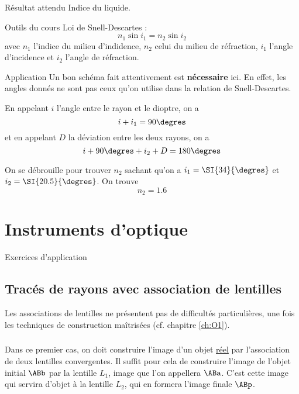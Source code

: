 \documentclass[10pt,a5paper,notitlepage]{book}
\begin{document}
\begin{NCprop}{Résultat attendu}
    Indice du liquide.
\end{NCprop}

\begin{NCdemo}{Outils du cours}
    Loi de Snell-Descartes :
    \[ n_1\sin i_1 = n_2 \sin i_2 \]
    avec $n_1$ l'indice du milieu d'indidence, $n_2$ celui du milieu de
    réfraction, $i_1$ l'angle d'incidence et $i_2$ l'angle de réfraction.
\end{NCdemo}

\begin{NCexem}{Application}
    Un bon schéma fait attentivement est \textbf{nécessaire} ici. En effet,
    les angles donnés ne sont pas ceux qu'on utilise dans la relation de
    Snell-Descartes. \bigbreak
    
    En appelant $i$ l'angle entre le rayon et le dioptre, on a
    \[ i + i_1 = 90\degres\]
    et en appelant $D$ la déviation entre les deux rayons, on a
    \[ i + 90\degres + i_2 + D = 180\degres\]

    On se débrouille pour trouver $n_2$ sachant qu'on a $i_1 = \SI{34}{\degres}$
    et $i_2 = \SI{20.5}{\degres}$. On trouve
    \[ \boxed{n_2 = 1.6} \]
\end{NCexem}

\chapter{Instruments d'optique}
\vspace*{-47pt}
\begin{center}
    \Huge Exercices d'application
\end{center}
\section{Tracés de rayons avec association de lentilles}
Les associations de lentilles ne présentent pas de difficultés particulières,
une fois les techniques de construction maîtrisées (cf. chapitre \ref{ch:O1}).

\subsection{}
Dans ce premier cas, on doit construire l'image d'un objet \underline{réel} par
l'association de deux lentilles convergentes. Il suffit pour cela de construire
l'image de l'objet initial $\ABb$ par la lentille $L_1$, image que l'on appellera
$\ABa$. C'est cette image qui servira d'objet à la lentille $L_2$, qui en
formera l'image finale $\ABp$. \bigbreak
\end{document}
